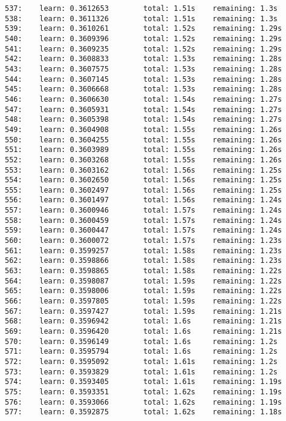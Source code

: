 \documentclass[11pt]{article}
\begin{document}
\begin{Verbatim}[commandchars=\\\{\}]
537:    learn: 0.3612653        total: 1.51s    remaining: 1.3s
538:    learn: 0.3611326        total: 1.51s    remaining: 1.3s
539:    learn: 0.3610261        total: 1.52s    remaining: 1.29s
540:    learn: 0.3609396        total: 1.52s    remaining: 1.29s
541:    learn: 0.3609235        total: 1.52s    remaining: 1.29s
542:    learn: 0.3608833        total: 1.53s    remaining: 1.28s
543:    learn: 0.3607575        total: 1.53s    remaining: 1.28s
544:    learn: 0.3607145        total: 1.53s    remaining: 1.28s
545:    learn: 0.3606668        total: 1.53s    remaining: 1.28s
546:    learn: 0.3606630        total: 1.54s    remaining: 1.27s
547:    learn: 0.3605931        total: 1.54s    remaining: 1.27s
548:    learn: 0.3605398        total: 1.54s    remaining: 1.27s
549:    learn: 0.3604908        total: 1.55s    remaining: 1.26s
550:    learn: 0.3604255        total: 1.55s    remaining: 1.26s
551:    learn: 0.3603989        total: 1.55s    remaining: 1.26s
552:    learn: 0.3603268        total: 1.55s    remaining: 1.26s
553:    learn: 0.3603162        total: 1.56s    remaining: 1.25s
554:    learn: 0.3602650        total: 1.56s    remaining: 1.25s
555:    learn: 0.3602497        total: 1.56s    remaining: 1.25s
556:    learn: 0.3601497        total: 1.56s    remaining: 1.24s
557:    learn: 0.3600946        total: 1.57s    remaining: 1.24s
558:    learn: 0.3600459        total: 1.57s    remaining: 1.24s
559:    learn: 0.3600447        total: 1.57s    remaining: 1.24s
560:    learn: 0.3600072        total: 1.57s    remaining: 1.23s
561:    learn: 0.3599257        total: 1.58s    remaining: 1.23s
562:    learn: 0.3598866        total: 1.58s    remaining: 1.23s
563:    learn: 0.3598865        total: 1.58s    remaining: 1.22s
564:    learn: 0.3598087        total: 1.59s    remaining: 1.22s
565:    learn: 0.3598006        total: 1.59s    remaining: 1.22s
566:    learn: 0.3597805        total: 1.59s    remaining: 1.22s
567:    learn: 0.3597427        total: 1.59s    remaining: 1.21s
568:    learn: 0.3596942        total: 1.6s     remaining: 1.21s
569:    learn: 0.3596420        total: 1.6s     remaining: 1.21s
570:    learn: 0.3596149        total: 1.6s     remaining: 1.2s
571:    learn: 0.3595794        total: 1.6s     remaining: 1.2s
572:    learn: 0.3595092        total: 1.61s    remaining: 1.2s
573:    learn: 0.3593829        total: 1.61s    remaining: 1.2s
574:    learn: 0.3593405        total: 1.61s    remaining: 1.19s
575:    learn: 0.3593351        total: 1.62s    remaining: 1.19s
576:    learn: 0.3593066        total: 1.62s    remaining: 1.19s
577:    learn: 0.3592875        total: 1.62s    remaining: 1.18s

\end{Verbatim}
\end{document}
